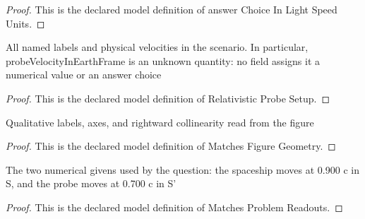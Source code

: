 \begin{proof}
  This is the declared model definition of answer Choice In Light Speed Units.
\end{proof}
\begin{definition}
  \label{def:physics:phyx-mini-0510:phyxminiproblems-problemphyxmini0510-relativisticprobesetup}
  All named labels and physical velocities in the scenario. In particular, probeVelocityInEarthFrame is an unknown quantity: no field assigns it a numerical value or an answer choice
\end{definition}
\begin{proof}
  This is the declared model definition of Relativistic Probe Setup.
\end{proof}
\begin{definition}
  \label{def:physics:phyx-mini-0510:phyxminiproblems-problemphyxmini0510-matchesfiguregeometry}
  Qualitative labels, axes, and rightward collinearity read from the figure
\end{definition}
\begin{proof}
  This is the declared model definition of Matches Figure Geometry.
\end{proof}
\begin{definition}
  \label{def:physics:phyx-mini-0510:phyxminiproblems-problemphyxmini0510-matchesproblemreadouts}
  The two numerical givens used by the question: the spaceship moves at 0.900 c in S, and the probe moves at 0.700 c in S'
\end{definition}
\begin{proof}
  This is the declared model definition of Matches Problem Readouts.
\end{proof}
